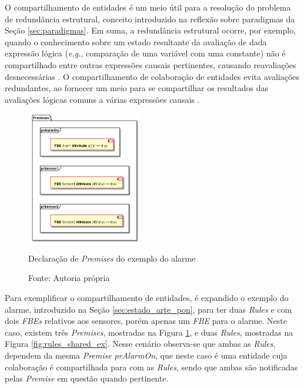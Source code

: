 O compartilhamento de entidades é um meio útil para a resolução do
problema de redundância estrutural, conceito introduzido na reflexão sobre
paradigmas da Seção \ref{sec:paradigmas}. Em suma, a redundância estrutural
ocorre, por exemplo, quando o conhecimento sobre um estado resultante da
avaliação de dada expressão lógica (\textit{e.g.}, comparação de uma variável com uma
constante) não é compartilhado entre outras expressões causais pertinentes,
causando reavaliações desnecessárias \cite{msc_Banaszewski_2009}. O
compartilhamento de colaboração de entidades evita avaliações redundantes, ao fornecer um meio
para se compartilhar os resultados das avaliações lógicas comuns a várias
expressões causais \cite{msc_Banaszewski_2009}.

\begin{figure}[!htb]
  \centering
  \includegraphics[width=0.45\textwidth]{../out/diagrams/shared_premises/premises.png}
  \smallskip
  \caption{Declaração de \textit{Premises} do exemplo do alarme}
  \caption*{Fonte: Autoria própria}
  \label{fig:premises_shared_ex}
\end{figure}

Para exemplificar o compartilhamento de entidades, é expandido o exemplo do
alarme, introduzido na Seção \ref{sec:estado_arte_pon}, para ter duas
\textit{Rules} e com dois \textit{FBEs} relativos aos sensores, porém apenas um
\textit{FBE} para o alarme. Neste caso, existem três \textit{Premises},
mostradas na Figura \ref{fig:premises_shared_ex}, e duas \textit{Rules},
mostradas na Figura \ref{fig:rules_shared_ex}. Nesse cenário observa-se que
ambas as \textit{Rules}, dependem da mesma \textit{Premise} \textit{prAlarmOn},
que neste caso é uma entidade cuja colaboração é compartilhada para com as
\textit{Rules}, sendo que ambas são notificadas pelas \textit{Premise} em
questão quando pertinente.


